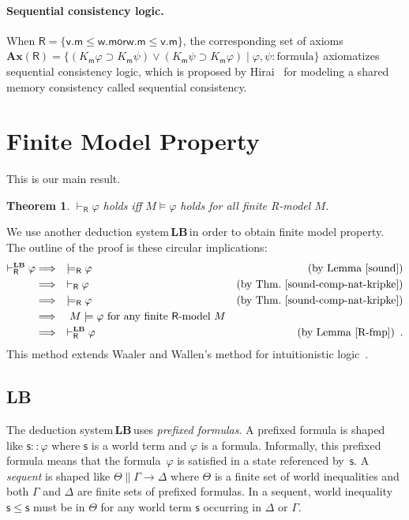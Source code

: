 \documentclass[doctor]{iscs-thesis}
\newcommand{\vdashR}{\vdash_{\mathsf R}}
\newcommand{\vdashRLB}{\vdashR^{\mbox{\tiny \LB}}}
\newcommand{\modelsR}{\models_{\mathsf R}}
\newtheorem{theorem}{Theorem}
\newcommand{\LB}{\textbf{LB}}
\newcommand{\wor}{\mathsf{{or}}}
\begin{document}
\paragraph{Sequential consistency logic.}
When $\mathsf R=\{\mathsf v.\mathsf m\le\mathsf w.\mathsf m\wor \mathsf
w.\mathsf m\le \mathsf v.\mathsf m\}$,
the corresponding set of axioms
$\mathbf{Ax}(\mathsf R) = \{(K_{\mathsf m}\varphi\supset K_{\mathsf
m}\psi)\vee(K_{\mathsf m}\psi\supset K_{\mathsf m}\varphi)\mid \varphi,
\psi\colon\mbox{formula}\}$
 axiomatizes sequential consistency logic,
which is proposed by Hirai~\cite{hirailpar} for modeling a shared memory consistency called sequential consistency.


\section{Finite Model Property}
\label{fmp-proof}

This is our main result.
\begin{theorem}
 \label{thm:fmp}
 $\vdashR\varphi$ holds iff $M\models \varphi$ holds
 for all finite {\sf R}-model $M$.
\end{theorem}

We use another deduction system\,\LB\,in order to obtain finite model
property.
The outline of the proof is these circular implications:
\begin{align*}
 \vdashRLB\varphi &\Longrightarrow \quad \models_{\mathsf R}\varphi\quad
 &(\mbox{by Lemma~\ref{sound}})\\
 &\Longrightarrow \quad \vdash_{\mathsf R}\varphi &(\mbox{by
 Thm.~\ref{sound-comp-nat-kripke}}) \\
 &\Longrightarrow\quad \modelsR\varphi &\mbox{(by Thm.~\ref{sound-comp-nat-kripke})}\\
 &\Longrightarrow\quad M\models\varphi \mbox{ for any finite $\mathsf
 R$-model }M\\
 &\Longrightarrow\quad \vdashRLB\varphi & (\mbox{by
 Lemma~\ref{R-fmp}})\enspace .
\end{align*}
This method extends Waaler
and Wallen's method for intuitionistic logic~\cite{waaler1999tableaux}.

\subsection{\LB}

The deduction system\,\LB\,uses \textit{prefixed formulas}.  A
prefixed formula is shaped like $\mathsf s::\varphi$ where $\mathsf s $
is a world term and $\varphi$ is a formula.
Informally, this prefixed formula means that the formula~$\varphi$ is
satisfied in a state referenced by~$\mathsf s$.
A \textit{sequent} is shaped like
  $\Theta\parallel \Gamma\longrightarrow \Delta$ where
$\Theta$ is a finite set of world inequalities and both
$\Gamma$ and $\Delta$ are finite sets of prefixed formulas.
In a sequent, world inequality
$\mathsf s\le \mathsf s$ must be in $\Theta$
 for any world term $\mathsf s$ occurring in $\Delta$ or $\Gamma$.
\end{document}
